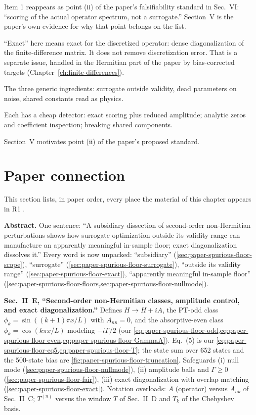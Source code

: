 Item 1 reappears as point (ii) of the paper's falsifiability standard in Sec.~VI: ``scoring of the actual operator spectrum, not a surrogate.'' Section~V is the paper's own evidence for why that point belongs on the list.

\begin{pitfall}
``Exact'' here means exact for the discretized operator: dense diagonalization of the finite-difference matrix. It does not remove discretization error. That is a separate issue, handled in the Hermitian part of the paper by bias-corrected targets (Chapter~\ref{ch:finite-differences}).
\end{pitfall}

\begin{keyideas}
\item The three generic ingredients: surrogate outside validity, dead parameters on noise, shared constants read as physics.
\item Each has a cheap detector: exact scoring plus reduced amplitude; analytic zeros and coefficient inspection; breaking shared components.
\item Section~V motivates point (ii) of the paper's proposed standard.
\end{keyideas}

\section{Paper connection}\label{sec:paper-spurious-floor-paper}

This section lists, in paper order, every place the material of this chapter appears in R1 \cite{soniR1}.

\textbf{Abstract.} One sentence: ``A subsidiary dissection of second-order non-Hermitian perturbations shows how surrogate optimization outside its validity range can manufacture an apparently meaningful in-sample floor; exact diagonalization dissolves it.'' Every word is now unpacked: ``subsidiary'' (\cref{sec:paper-spurious-floor-scope}), ``surrogate'' (\cref{sec:paper-spurious-floor-surrogate}), ``outside its validity range'' (\cref{sec:paper-spurious-floor-exact}), ``apparently meaningful in-sample floor'' (\cref{sec:paper-spurious-floor-floors,sec:paper-spurious-floor-nullmode}).

\textbf{Sec.~II~E, ``Second-order non-Hermitian classes, amplitude control, and exact diagonalization.''} Defines $H\to H+iA$, the PT-odd class $\phi_k=\sin((k+1)\pi x/L)$ with $A_{nn}=0$, and the absorptive-even class $\phi_k=\cos(k\pi x/L)$ modeling $-i\Gamma/2$ (our \cref{eq:paper-spurious-floor-odd,eq:paper-spurious-floor-even,eq:paper-spurious-floor-GammaA}). Eq.~(5) is our \cref{eq:paper-spurious-floor-eq5,eq:paper-spurious-floor-T}; the state sum over 652 states and the 500-state bias are \cref{fig:paper-spurious-floor-truncation}. Safeguards (i) null mode (\cref{sec:paper-spurious-floor-nullmode}), (ii) amplitude balls and $\Gamma\ge0$ (\cref{sec:paper-spurious-floor-fair}), (iii) exact diagonalization with overlap matching (\cref{sec:paper-spurious-floor-exact}). Notation overloads: $A$ (operator) versus $A_{nk}$ of Sec.~II~C; $T^{(n)}$ versus the window $T$ of Sec.~II~D and $T_k$ of the Chebyshev basis.

